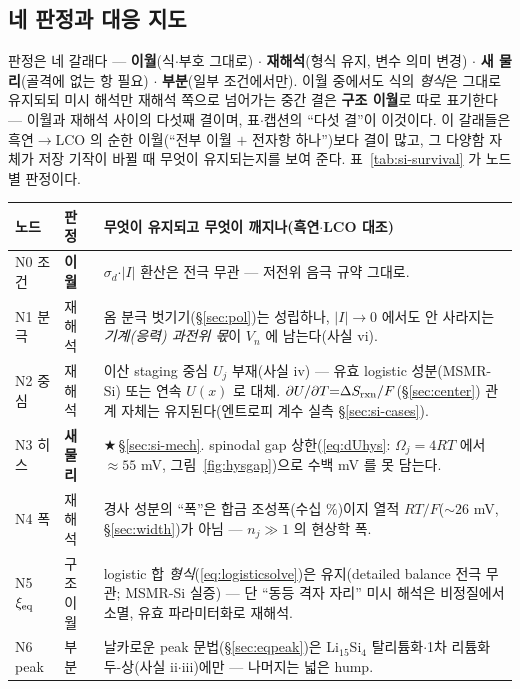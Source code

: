 \subsection{네 판정과 대응 지도}\label{ssec:si-verdicts}
판정은 네 갈래다 --- \textbf{이월}(식$\cdot$부호 그대로) $\cdot$ \textbf{재해석}(형식 유지, 변수 의미
변경) $\cdot$ \textbf{새 물리}(골격에 없는 항 필요) $\cdot$ \textbf{부분}(일부 조건에서만). 이월 중에서도
식의 \emph{형식}은 그대로 유지되되 미시 해석만 재해석 쪽으로 넘어가는 중간 결은 \textbf{구조 이월}로 따로
표기한다 --- 이월과 재해석 사이의 다섯째 결이며, 표$\cdot$캡션의 ``다섯 결''이 이것이다. 이 갈래들은
흑연$\to$LCO 의 순한 이월(``전부 이월 $+$ 전자항 하나'')보다 결이 많고, 그 다양함 자체가 저장 기작이
바뀔 때 무엇이 유지되는지를 보여 준다. 표~\ref{tab:si-survival} 가 노드별 판정이다.

\begin{table}[h]
\centering
\small
\begin{tabular}{p{} p{} p{}}
\toprule
노드 & 판정 & 무엇이 유지되고 무엇이 깨지나(흑연$\cdot$LCO 대조) \\
\midrule
N0 조건 & \textbf{이월} & $\sigma_d$$\cdot$$|I|$ 환산은 전극 무관 --- 저전위 음극 규약 그대로. \\
N1 분극 & 재해석 & 옴 분극 벗기기(\S\ref{sec:pol})는 성립하나, $|I|\!\to\!0$ 에서도 안 사라지는 \emph{기계(응력) 과전위 몫}이 $V_n$ 에 남는다(사실 vi). \\
N2 중심 & 재해석 & 이산 staging 중심 $U_j$ 부재(사실 iv) --- 유효 logistic 성분(MSMR-Si\cite{verbrugge_lisi2016}) 또는 연속 $U(x)$\cite{chevrier_dahn2009} 로 대체. $\partial U/\partial T{=}\Delta S_{\mathrm{rxn}}/F$(\S\ref{sec:center}) 관계 자체는 유지된다(엔트로피 계수 실측 \S\ref{sec:si-cases}). \\
N3 히스 & \textbf{새 물리} & $\bigstar$\,\S\ref{sec:si-mech}. spinodal gap 상한(\eqref{eq:dUhys}: $\Omega_j{=}4RT$ 에서 $\approx55$ mV, 그림~\ref{fig:hysgap})으로 수백 mV 를 못 담는다. \\
N4 폭 & 재해석 & 경사 성분의 ``폭''은 합금 조성폭(수십 \%)이지 열적 $RT/F$($\sim26$ mV, \S\ref{sec:width})가 아님 --- $n_j\!\gg\!1$ 의 현상학 폭. \\
N5 $\xi_{\mathrm{eq}}$ & 구조 이월 & logistic 합 \emph{형식}(\eqref{eq:logisticsolve})은 유지(detailed balance 전극 무관; MSMR-Si 실증) --- 단 ``동등 격자 자리'' 미시 해석은 비정질에서 소멸, 유효 파라미터화로 재해석. \\
N6 peak & 부분 & 날카로운 peak 문법(\S\ref{sec:eqpeak})은 Li$_{15}$Si$_4$ 탈리튬화$\cdot$1차 리튬화 두-상(사실 ii$\cdot$iii)에만 --- 나머지는 넓은 hump. \\

\end{tabular}
\end{table}
